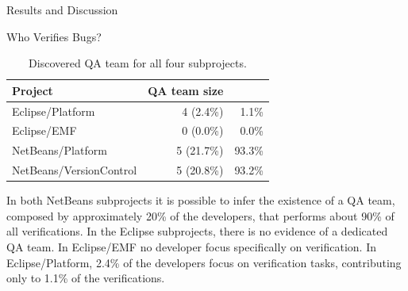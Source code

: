 \begin{section}{Results and Discussion}
\begin{subsection}{Who Verifies Bugs?}
	\begin{table}
		\begin{center}
		
		\caption{Discovered QA team for all four subprojects.} \label{tab:qa}
		\begin{tabular}{l|r|r}
			\textbf{\centering Project} & 
			\textbf{\centering QA team size} & 
			\MyHead{2.5cm}{\textbf{\% of verifications by QA team}} \\
			\hline
			Eclipse/Platform        & 4 (2.4\%)  &  1.1\% \\
			Eclipse/EMF             & 0 (0.0\%)  &  0.0\% \\
			NetBeans/Platform       & 5 (21.7\%) & 93.3\% \\
			NetBeans/VersionControl & 5 (20.8\%) & 93.2\% \\
		\end{tabular}
		\end{center}

	\end{table}
	
	
% 
% 
% 
	
	In both NetBeans subprojects it is possible to infer the existence of a QA team, composed by approximately 20\% of the developers, that performs about 90\% of all verifications. In the Eclipse subprojects, there is no evidence of a dedicated QA team. In Eclipse/EMF no developer focus specifically on verification. In Eclipse/Platform, 2.4\% of the developers focus on verification tasks, contributing only to 1.1\% of the verifications.
	
	
\end{subsection}

\end{section}

